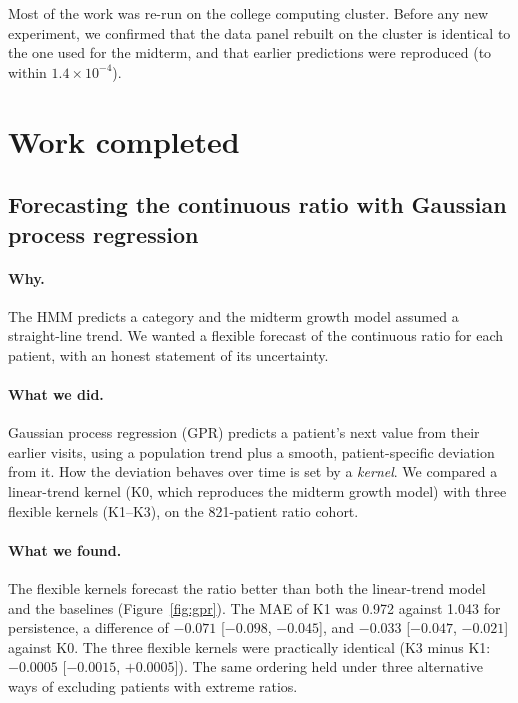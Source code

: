 \documentclass[11pt,a4paper]{article}
\begin{document}
Most of the work was re-run on the college computing cluster. Before any new
experiment, we confirmed that the data panel rebuilt on the cluster is
identical to the one used for the midterm, and that earlier predictions were
reproduced (to within $1.4\times10^{-4}$).

\section{Work completed}

\subsection{Forecasting the continuous ratio with Gaussian process regression}

\paragraph{Why.} The HMM predicts a category and the midterm growth model
assumed a straight-line trend. We wanted a flexible forecast of the continuous
ratio for each patient, with an honest statement of its uncertainty.

\paragraph{What we did.} Gaussian process regression (GPR) \cite{gpml} predicts
a patient's next value from their earlier visits, using a population trend
plus a smooth, patient-specific deviation from it. How the deviation behaves
over time is set by a \emph{kernel}. We compared a linear-trend kernel (K0,
which reproduces the midterm growth model) with three flexible kernels
(K1--K3), on the 821-patient ratio cohort.

\paragraph{What we found.} The flexible kernels forecast the ratio better than
both the linear-trend model and the baselines (Figure~\ref{fig:gpr}). The MAE
of K1 was 0.972 against 1.043 for persistence, a difference of $-0.071$
[$-0.098$, $-0.045$], and $-0.033$ [$-0.047$, $-0.021$] against K0. The three
flexible kernels were practically identical (K3 minus K1: $-0.0005$
[$-0.0015$, $+0.0005$]). The same ordering held under three alternative ways of
excluding patients with extreme ratios.
\end{document}
